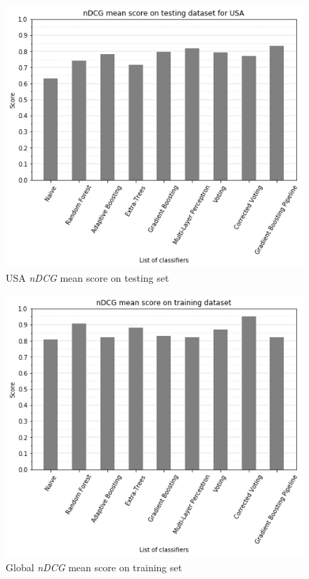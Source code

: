 \documentclass[twocolumn, switch]{article}
\begin{document}
\begin{figure}[H]
\centering
\includegraphics[scale=0.35]{../graphs/ndcg_mean_score_us_test}
\caption{USA \textit{nDCG} mean score on testing set}
\label{fig:ndcgtestus}
\end{figure}

\begin{figure}[H]
\centering
\includegraphics[scale=0.35]{../graphs/ndcg_mean_score_train}
\caption{Global \textit{nDCG} mean score on training set}
\label{fig:ndcgtrain}
\end{figure}
\end{document}

